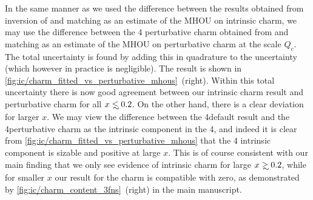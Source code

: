 In the same manner as we used the difference between the results obtained from
inversion of \nnlo and \nnnlo  matching as an estimate of the MHOU on
intrinsic charm, we may use the difference between the 4\fns
 perturbative charm obtained from \nnlo and \nnnlo matching as an
 estimate of the MHOU on perturbative charm at the scale $Q_c$.
 The total uncertainty is found by adding
 this in quadrature to the \pdf uncertainty (which however in practice
 is negligible).
%
The result is shown in 
\cref{fig:ic/charm_fitted_vs_perturbative_mhous}~(right).
Within this total uncertainty there is now good agreement between our
intrinsic charm result and perturbative charm for all
$x\lsim 0.2$. On the other hand, there is a clear deviation for larger
$x$. We may view the difference between the 4\fns default result
and the 4\fns perturbative  charm as the intrinsic component in the
4\fns, and indeed it is clear from
\cref{fig:ic/charm_fitted_vs_perturbative_mhous} that the 4\fns
intrinsic component is sizable and positive at large $x$.
%
This is of course consistent with our main finding that we
only see evidence of intrinsic charm for large $x\gsim 0.2$, while for
smaller $x$ our result for the charm \pdf is compatible with zero, as demonstrated by
\cref{fig:ic/charm_content_3fns}~(right) in the main manuscript.


